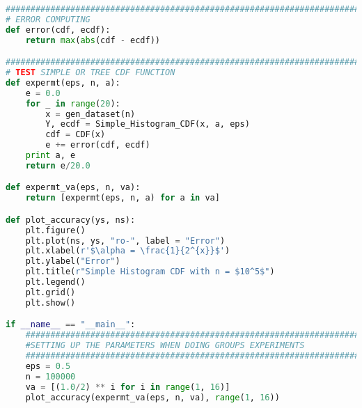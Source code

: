 \begin{lstlisting}[label=code-alg2, language=Python, caption=Python Code For Algorithm 2 Simple Histogram CDF]
#############################################################################
# ERROR COMPUTING
def error(cdf, ecdf):
	return max(abs(cdf - ecdf))

#############################################################################
# TEST SIMPLE OR TREE CDF FUNCTION
def expermt(eps, n, a):
	e = 0.0
	for _ in range(20):
		x = gen_dataset(n)
		Y, ecdf = Simple_Histogram_CDF(x, a, eps)
		cdf = CDF(x)
		e += error(cdf, ecdf)
	print a, e
	return e/20.0

def expermt_va(eps, n, va):
	return [expermt(eps, n, a) for a in va]

def plot_accuracy(ys, ns):
	plt.figure()
	plt.plot(ns, ys, "ro-", label = "Error")
	plt.xlabel(r'$\alpha = \frac{1}{2^{x}}$')
	plt.ylabel("Error")
	plt.title(r"Simple Histogram CDF with n = $10^5$")
	plt.legend()
	plt.grid()
	plt.show()

if __name__ == "__main__":
	#############################################################################
	#SETTING UP THE PARAMETERS WHEN DOING GROUPS EXPERIMENTS
	#############################################################################
	eps = 0.5
	n = 100000
	va = [(1.0/2) ** i for i in range(1, 16)]
	plot_accuracy(expermt_va(eps, n, va), range(1, 16))

\end{lstlisting}

